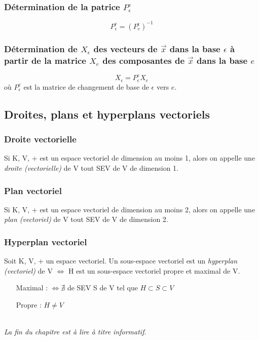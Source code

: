 \documentclass[12pt, a4paper]{article}
\begin{document}
\subsubsection{Détermination de la patrice $P_\epsilon^e$}
$$P_\epsilon^e = (P_e^\epsilon)^{-1}$$

\subsubsection{Détermination de $X_\epsilon$ des vecteurs de $\vec{x}$ dans la base $\epsilon$ à partir de la matrice $X_e$ des composantes de $\vec{x}$ dans la base $e$}
$$X_\epsilon = P_\epsilon^e X_e$$
où $P_\epsilon^e$ est la matrice de changement de base de $\epsilon$ vers $e$.

\subsection{Droites, plans et hyperplans vectoriels}
\subsubsection{Droite vectorielle}
Si K, V, + est un espace vectoriel de dimension au moins 1, alors on appelle une \textit{droite (vectorielle)} de V tout SEV de V de dimension 1.

\subsubsection{Plan vectoriel}
Si K, V, + est un espace vectoriel de dimension au moins 2, alors on appelle une \textit{plan (vectoriel)} de V tout SEV de V de dimension 2.

\subsubsection{Hyperplan vectoriel}
Soit K, V, + un espace vectoriel. Un sous-espace vectoriel est un \textit{hyperplan (vectoriel)} de V $\Leftrightarrow$ H est un sous-espace vectoriel propre et maximal de V.\\
\begin{itemize}
\item[Maximal] : $\Leftrightarrow \nexists$ de SEV S de V tel que $H\subset S \subset V$
\item[Propre] : $H \neq V$
\end{itemize}
\ \\
\textit{La fin du chapitre est à lire à titre informatif}.
\end{document}
